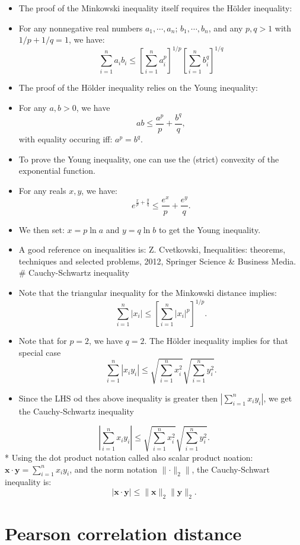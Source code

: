 \documentclass[
]{article}
\providecommand{\tightlist}{%
  \setlength{\itemsep}{0pt}\setlength{\parskip}{0pt}}
\begin{document}
\begin{itemize}
\tightlist
\item
  The proof of the Minkowski inequality itself requires the Hölder
  inequality:
\item
  For any nonnegative real numbers \(a_1,\cdots,a_n\);
  \(b_1,\cdots,b_n\), and any \(p,q>1\) with \(1/p+1/q=1\), we have: \[
  \sum_{i=1}^n a_ib_i\leq
  \left[\sum_{i=1}^n a_i^{p}\right]^{1/p}
  \left[\sum_{i=1}^n b_i^{q}\right]^{1/q}
  \]
\item
  The proof of the Hölder inequality relies on the Young inequality:
\item
  For any \(a,b>0\), we have \[
  ab\leq \frac{a^p}{p}+\frac{b^q}{q},
  \] with equality occuring iff: \(a^p=b^q\).
\item
  To prove the Young inequality, one can use the (strict) convexity of
  the exponential function.
\item
  For any reals \(x,y\), we have: \[
  e^{\frac{x}{p}+\frac{y}{q} }\leq \frac{e^{x}}{p}+\frac{e^{y}}{q}. 
  \]
\item
  We then set: \(x=p\ln a\) and \(y=q\ln b\) to get the Young
  inequality.
\item
  A good reference on inequalities is: Z. Cvetkovski, Inequalities:
  theorems, techniques and selected problems, 2012, Springer Science \&
  Business Media. \# Cauchy-Schwartz inequality
\item
  Note that the triangular inequality for the Minkowski distance
  implies: \[
  \sum_{i=1}^n |x_i|\leq
  \left[\sum_{i=1}^n |x_i|^{p}\right]^{1/p}.
  \]
\item
  Note that for \(p=2\), we have \(q=2\). The Hölder inequality implies
  for that special case \[
  \sum_{i=1}^n|x_iy_i|\leq\sqrt{\sum_{i=1}^n x_i^2}\sqrt{\sum_{i=1}^n y_i^2}. 
  \]
\item
  Since the LHS od thes above inequality is greater then
  \(|\sum_{i=1}^nx_iy_i|\), we get the Cauchy-Schwartz inequality
\end{itemize}

\[
|\sum_{i=1}^nx_iy_i|\leq\sqrt{\sum_{i=1}^n x_i^2}\sqrt{\sum_{i=1}^n y_i^2}. 
\] * Using the dot product notation called also scalar product noation:
\(\mathbf{x\cdot y}=\sum_{i=1}^nx_iy_i\), and the norm notation
\(\|\mathbf{\cdot}\|_2 \|\), the Cauchy-Schwart inequality is: \[
|\mathbf{x\cdot y} | \leq \|\mathbf{x}\|_2 \| \mathbf{y}\|_2.
\]

\hypertarget{pearson-correlation-distance}{%
\section{Pearson correlation
distance}\label{pearson-correlation-distance}}
\end{document}

